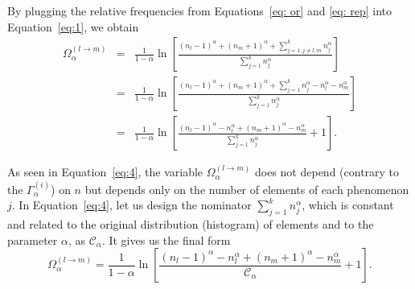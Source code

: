 \documentclass[entropy,article,accept,moreauthors,pdftex,10pt,a4paper]{mdpi}
\begin{document}
By plugging the relative frequencies from Equations~\eqref{eq: or} and \eqref{eq: rep} into Equation~\eqref{eq:1}, we obtain
\begin{eqnarray}
\label{eq:4}
\Omega_\alpha^{(l \rightarrow m)} &=& \frac{1}{1-\alpha} \ln{\left[\frac{(n_{l}-1)^\alpha + (n_{m}+1)^\alpha + \sum_{j=1,j \neq l,m}^{k} {n_{j}^\alpha}}{\sum_{j=1}^{k}{n_{j}^\alpha}}  \right]} \nonumber \\
&=& \frac{1}{1-\alpha} \ln{\left[\frac{(n_{l}-1)^\alpha + (n_{m}+1)^\alpha + \sum_{j=1}^{k} {n_{j}^\alpha} - n_{l}^\alpha - n_{m}^\alpha}{\sum_{j=1}^{k}{n_{j}^\alpha}}  \right]} \nonumber \\ &=&
\frac{1}{1-\alpha} \ln{\left[\frac{(n_{l}-1)^\alpha - n_{l}^\alpha + (n_{m}+1)^\alpha - n_{m}^\alpha}{\sum_{j=1}^{k}{n_{j}^\alpha}} + 1 \right].}
\end{eqnarray}

As seen in Equation~\eqref{eq:4}, the variable $\Omega_\alpha^{(l \rightarrow m)}$ does not depend (contrary to the $\Gamma_\alpha^{(i)}$) on $n$ but depends only on the number of elements of each phenomenon $j$. In Equation~\eqref{eq:4}, let us design the nominator $\sum_{j=1}^k{n_{j}^\alpha}$, which is constant and related to the original distribution (histogram) of elements and to the parameter $\alpha$, as $\mathcal{C}_\alpha$. It gives us the final form\vspace{12pt}
\begin{equation}
\label{eq:6}
\Omega_\alpha^{(l \rightarrow m)} = \frac{1}{1-\alpha} \ln{\left[\frac{(n_{l}-1)^\alpha - n_{l}^\alpha + (n_{m}+1)^\alpha - n_{m}^\alpha}{\mathcal{C}_\alpha} + 1 \right].}
\end{equation}
\end{document}
